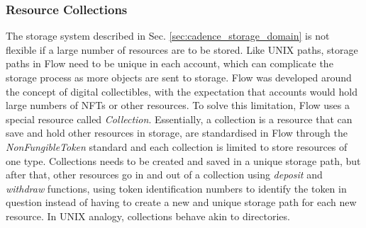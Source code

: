 \documentclass[../NFTComp_IEEE.tex]{subfiles}
\begin{document}
\subsubsection{Resource Collections}
\label{sec:resource_collections}
The storage system described in Sec. \ref{sec:cadence_storage_domain} is not flexible if a large number of resources are to be stored. Like UNIX paths, storage paths in Flow need to be unique in each account, which can complicate the storage process as more objects are sent to storage. Flow was developed around the concept of digital collectibles, with the expectation that accounts would hold large numbers of NFTs or other resources. To solve this limitation, Flow uses a special resource called \textit{Collection}. Essentially, a collection is a resource that can save and hold other resources in storage, are standardised in Flow through the \textit{NonFungibleToken} standard and each collection is limited to store resources of one type. Collections needs to be created and saved in a unique storage path, but after that, other resources go in and out of a collection using \textit{deposit} and \textit{withdraw} functions, using token identification numbers to identify the token in question instead of having to create a new and unique storage path for each new resource. In UNIX analogy, collections behave akin to directories.
\end{document}
